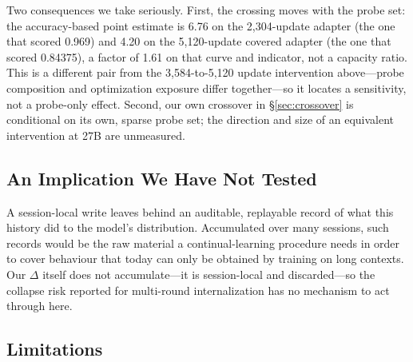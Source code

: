 \documentclass[sigconf,nonacm]{acmart}
\begin{document}
Two consequences we take seriously. First, the crossing moves with the probe set: the accuracy-based point
estimate is 6.76 on the 2{,}304-update adapter (the one that scored 0.969) and 4.20 on the 5{,}120-update
covered adapter (the one that scored 0.84375), a factor of 1.61 on that curve and indicator, not a capacity
ratio. This is a different pair from the 3{,}584-to-5{,}120 update intervention above---probe composition and
optimization exposure differ together---so it locates a sensitivity, not a probe-only effect. Second, our own
crossover in \S\ref{sec:crossover} is conditional on its own, sparse probe set; the direction and size of an
equivalent intervention at 27B are unmeasured.

\subsection{An Implication We Have Not Tested}

A session-local write leaves behind an auditable,
replayable record of what this history did to the model's distribution. Accumulated over many sessions,
such records would be the raw material a continual-learning procedure needs in order to cover behaviour
that today can only be obtained by training on long contexts. Our $\Delta$ itself does not accumulate---it
is session-local and discarded---so the collapse risk reported for multi-round internalization
\cite{collapse2026,shumailov2024} has no mechanism to act through here.

\subsection{Limitations}\label{sec:limits}
\end{document}
